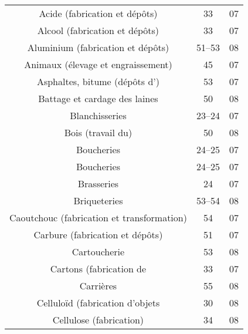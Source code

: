 \begin{minipage}[t]{0.49\linewidth}
\begin{tabularx}{\textwidth}[t]{c X c c}
\multicolumn{2}{p{4.8cm}}{Acide (fabrication et dépôts)}										 				&	33				&	07 \\	
\multicolumn{2}{p{4.8cm}}{Alcool (fabrication et dépôts)}										 				&	33				&	07 \\	
\multicolumn{2}{p{4.8cm}}{Aluminium (fabrication et dépôts)}										 		&	51--53		&	08 \\	
\multicolumn{2}{p{4.8cm}}{Animaux (élevage et engraissement)}										 	&	45				&	07 \\	
\multicolumn{2}{p{4.8cm}}{Asphaltes, bitume (dépôts d')}										 				&	53				&	07 \\	
\multicolumn{2}{p{4.8cm}}{Battage et cardage des laines}											 				&	50				&	08 \\	
\multicolumn{2}{p{4.8cm}}{Blanchisseries}																 				&	23--24		&	07 \\	
\multicolumn{2}{p{4.8cm}}{Bois (travail du)}																 			&	50				&	08 \\
\multicolumn{2}{p{4.8cm}}{Boucheries}																		 			&	24--25		&	07 \\	
\multicolumn{2}{p{4.8cm}}{Boucheries}																		 			&	24--25		&	07 \\	
\multicolumn{2}{p{4.8cm}}{Brasseries}																		 			&	24				&	07 \\	
\multicolumn{2}{p{4.8cm}}{Briqueteries}																		 		&	53--54		&	08 \\	
\multicolumn{2}{p{4.8cm}}{Caoutchouc (fabrication et transformation)}								 	&	54				&	07 \\	
\multicolumn{2}{p{4.8cm}}{Carbure (fabrication et dépôts)}								 					&	51				&	07 \\	
\multicolumn{2}{p{4.8cm}}{Cartoucherie}								 												&	53				&	08 \\	
\multicolumn{2}{p{4.8cm}}{Cartons (fabrication de}																&	33				&	07 \\	
\multicolumn{2}{p{4.8cm}}{Carrières}									 												&	55				&	08 \\
\multicolumn{2}{p{4.8cm}}{Celluloïd (fabrication d'objets}														&	30				&	08 \\	
\multicolumn{2}{p{4.8cm}}{Cellulose (fabrication)}									 								&	34				&	08 \\	
\end{tabularx}
\end{minipage}
\hfill
